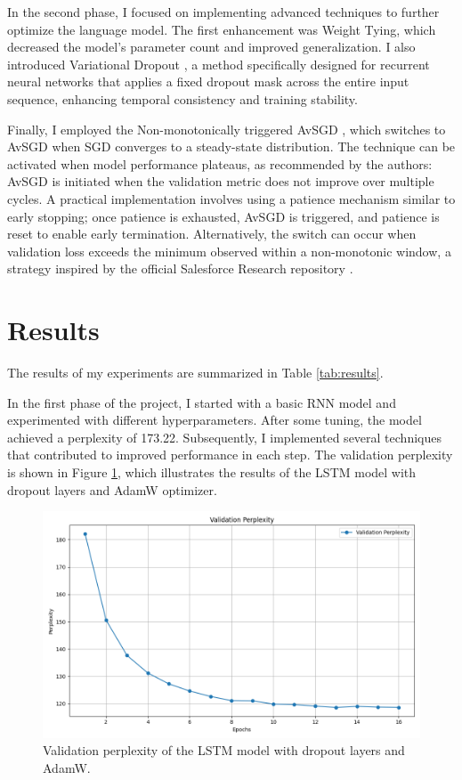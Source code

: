 \documentclass[a4paper]{article}
\begin{document}
In the second phase, I focused on implementing advanced techniques
 to further optimize the language model. The first enhancement was Weight Tying,
  which decreased the model’s parameter count and improved generalization. I also 
  introduced Variational Dropout \cite{gal2016theoreticallygroundedapplicationdropout}, 
  a method specifically designed for recurrent neural networks that applies a fixed dropout 
  mask across the entire input sequence, enhancing temporal consistency and training stability.

Finally, I employed the Non-monotonically triggered AvSGD \cite{merityRegOpt}, which 
switches to AvSGD when SGD converges to a steady-state distribution. The technique can be
 activated when model performance plateaus, as recommended by the authors: AvSGD is initiated 
 when the validation metric does not improve over multiple cycles. A practical implementation 
 involves using a patience mechanism similar to early stopping; once patience is exhausted, AvSGD
  is triggered, and patience is reset to enable early termination. Alternatively, the switch 
  can occur when validation loss exceeds the minimum observed within a non-monotonic window, a 
  strategy inspired by the official Salesforce Research repository \cite{salesforce-repo}.

\section{Results}
The results of my experiments are summarized in Table \ref{tab:results}.

In the first phase of the project, I started with a basic RNN model and experimented with different hyperparameters. 
After some tuning, the model achieved a perplexity of 173.22. Subsequently, I implemented several techniques that contributed 
to improved performance in each step. The validation perplexity is shown in Figure \ref{fig:plot}, which illustrates the results 
of the LSTM model with dropout layers and AdamW optimizer.

\begin{figure}[h!]
\centering
\includegraphics[width=0.8\linewidth]{images/part_A.png}
\caption{Validation perplexity of the LSTM model with dropout layers and AdamW.}
\label{fig:plot}
\end{figure}
\end{document}
